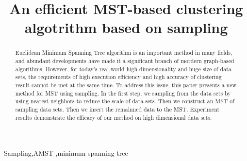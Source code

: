 
\begin{frontmatter}
	\title{An efficient MST-based clustering algotrithm based on sampling}
	\begin{abstract}
		Euclidean Minimum Spanning Tree algorithm is an important method in many fields, and abundant developments have made it a significant branch of mordern graph-based algorithms. However, for today's real-world high dimensionality and huge size of data sets, the requirements of high execution efficiency and high accuracy of clustering result cannot be met at the same time. To address this issue, this paper presents a new method for MST using sampling. In the first step, we sampling from the data sets by using nearest neighbors to reduce the scale of data sets. Then we construct an MST of sampling data sets. Then we insert the remainned data to the MST. Experiment results demonstrate the efficacy of our method on high dimensional data sets. 
	\end{abstract}
	
	\begin{keyword}
		Sampling\sep AMST \sep  minimum spanning tree 
	\end{keyword}
\end{frontmatter}
